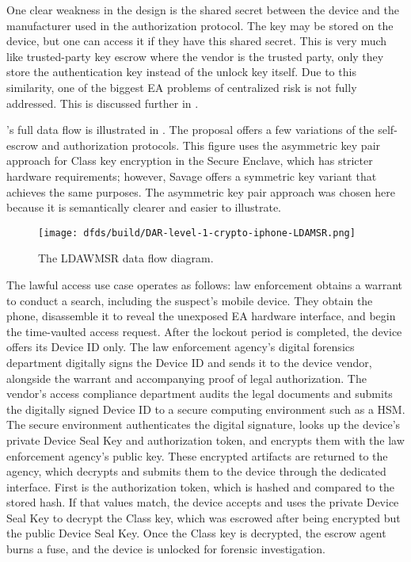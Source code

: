 One clear weakness in the design is the shared secret between the device and the manufacturer used in the authorization
protocol. The key may be stored on the device, but one can access it if they have this shared secret. This is very much
like trusted-party key escrow where the vendor is the trusted party, only they store the authentication key instead of
the unlock key itself. Due to this similarity, one of the biggest \ac{EA} problems of centralized risk is not fully
addressed. This is discussed further in .

\ldawmsR's full data flow is illustrated in . The proposal offers a few variations of the
self-escrow and authorization protocols. This figure uses the asymmetric key pair approach for Class key encryption in
the Secure Enclave, which has stricter hardware requirements; however, Savage offers a symmetric key variant that
achieves the same purposes. The asymmetric key pair approach was chosen here because it is semantically clearer and
easier to illustrate.

\begin{figure}[p]
    \centering\CaptionFontSize
    \texttt{[image: dfds/build/DAR-level-1-crypto-iphone-LDAMSR.png]}
    \caption{The LDAWMSR data flow diagram.}
    \label{fig-dfd-ldawmsr}
\end{figure}

The lawful access use case operates as follows: law enforcement obtains a warrant to conduct a search, including the
suspect's mobile device. They obtain the phone, disassemble it to reveal the unexposed \ac{EA} hardware interface, and
begin the time-vaulted access request. After the lockout period is completed, the device offers its Device ID only. The
law enforcement agency's digital forensics department digitally signs the Device ID and sends it to the device vendor,
alongside the warrant and accompanying proof of legal authorization. The vendor's access compliance department audits
the legal documents and submits the digitally signed Device ID to a secure computing environment such as a \ac{HSM}. The
secure environment authenticates the digital signature, looks up the device's private Device Seal Key and authorization
token, and encrypts them with the law enforcement agency's public key. These encrypted artifacts are returned to the
agency, which decrypts and submits them to the device through the dedicated interface. First is the authorization token,
which is hashed and compared to the stored hash. If that values match, the device accepts and uses the private Device
Seal Key to decrypt the Class key, which was escrowed after being encrypted but the public Device Seal Key. Once the
Class key is decrypted, the escrow agent burns a fuse, and the device is unlocked for forensic investigation.

